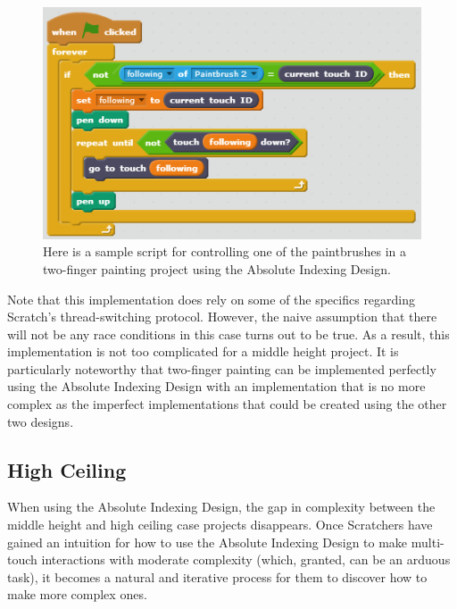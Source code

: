 \begin{figure}
\centering
\includegraphics{images/TwoFingerPaintingAID.PNG}
\caption[Sample Absolute Indexing Design Script for Two-Finger Painting]
{Here is a sample script for controlling one of the paintbrushes in a two-finger painting project using the Absolute Indexing Design.}
\label{TwoFingerPaintingAID}
\end{figure}

Note that this implementation does rely on some of the specifics regarding Scratch's thread-switching protocol. However, the naive assumption that there will not be any race conditions in this case turns out to be true. As a result, this implementation is not too complicated for a middle height project. It is particularly noteworthy that two-finger painting can be implemented perfectly using the Absolute Indexing Design with an implementation that is no more complex as the imperfect implementations that could be created using the other two designs.

\subsection{High Ceiling}

When using the Absolute Indexing Design, the gap in complexity between the middle height and high ceiling case projects disappears. Once Scratchers have gained an intuition for how to use the Absolute Indexing Design to make multi-touch interactions with moderate complexity (which, granted, can be an arduous task), it becomes a natural and iterative process for them to discover how to make more complex ones.

